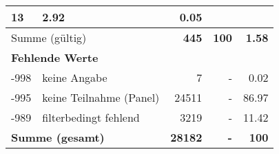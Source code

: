 \begin{longtable}{lXrrr}
       \num{13} &
       \num[round-mode=places,round-precision=2]{2.92} &
         \num[round-mode=places,round-precision=2]{0.05} \\
     \midrule
     \multicolumn{2}{l}{Summe (gültig)} &
       \textbf{\num{445}} &
     \textbf{\num{100}} &
       \textbf{\num[round-mode=places,round-precision=2]{1.58}} \\
     \multicolumn{5}{l}{\textbf{Fehlende Werte}}\\
       -998 &
       keine Angabe &
         \num{7} &
        - &
         \num[round-mode=places,round-precision=2]{0.02} \\
       -995 &
       keine Teilnahme (Panel) &
         \num{24511} &
        - &
         \num[round-mode=places,round-precision=2]{86.97} \\
       -989 &
       filterbedingt fehlend &
         \num{3219} &
        - &
         \num[round-mode=places,round-precision=2]{11.42} \\
     \midrule
     \multicolumn{2}{l}{\textbf{Summe (gesamt)}} &
          \textbf{\num{28182}} &
        \textbf{-} &
        \textbf{\num{100}} \\
     \bottomrule
     \end{longtable}
     
